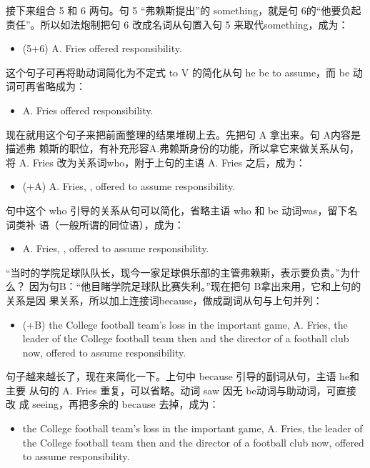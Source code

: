 接下来组合 5 和 6 两句。句 5 “弗赖斯提出”的 something，就是句 6的“他要负起
责任”。所以如法炮制把句 6 改成名词从句置入句 5 来取代something，成为：
\begin{itemize}
\item (5+6) A. Fries offered  responsibility.
\end{itemize}
这个句子可再将助动词简化为不定式 to V 的简化从句 he be to assume，而 be
动词可再省略成为：
\begin{itemize}
\item A. Fries offered  responsibility.
\end{itemize}

现在就用这个句子来把前面整理的结果堆砌上去。先把句 A 拿出来。句 A内容是描述弗
赖斯的职位，有补充形容A.弗赖斯身份的功能，所以拿它来做关系从句，将 A. Fries
改为关系词who，附于上句的主语 A. Fries 之后，成为：
\begin{itemize}
\item (+A) A. Fries, , offered to assume responsibility.
\end{itemize}
句中这个 who 引导的关系从句可以简化，省略主语 who 和 be 动词was，留下名词类补
语（一般所谓的同位语），成为：
\begin{itemize}
\item A. Fries, , offered to assume responsibility.
\end{itemize}
“当时的学院足球队队长，现今一家足球俱乐部的主管弗赖斯，表示要负责。”为什么？
因为句B：“他目睹学院足球队比赛失利。”现在把句 B拿出来用，它和上句的关系是因
果关系，所以加上连接词because，做成副词从句与上句并列：
\begin{itemize}
\item (+B)  the College football team's loss in the important
  game, A. Fries, the leader of the College football team then and the
  director of a football club now, offered to assume responsibility.
\end{itemize}
句子越来越长了，现在来简化一下。上句中 because 引导的副词从句，主语 he和主要
从句的 A. Fries 重复，可以省略。动词 saw 因无 be动词与助动词，可直接改
成 seeing，再把多余的 because 去掉，成为：
\begin{itemize}
\item {} the College football team's loss in the important game, A. Fries,
  the leader of the College football team then and the director of a
  football club now, offered to assume responsibility.
\end{itemize}

